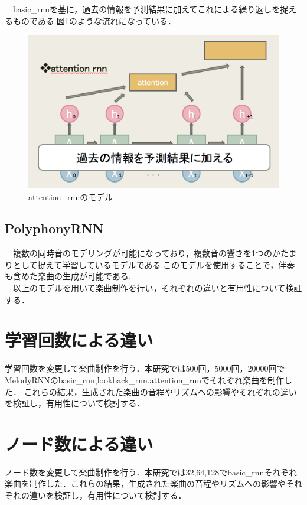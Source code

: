 　basic\_rnnを基に，過去の情報を予測結果に加えてこれによる繰り返しを捉えるものである.図\ref{fig:attentio_rnnのモデル}のような流れになっている．
\begin{figure}[!ht]
    \begin{screen}
    \begin{center}
        \includegraphics[scale=0.8,clip]{./img/attention1.png}
        \caption{attention\_rnnのモデル}
        \label{fig:attentio_rnnのモデル}
    \end{center}
    \end{screen}
\end{figure}
\subsection{PolyphonyRNN}
　複数の同時音のモデリングが可能になっており，複数音の響きを1つのかたまりとして捉えて学習しているモデルである.このモデルを使用することで，伴奏も含めた楽曲の生成が可能である.\\
　以上のモデルを用いて楽曲制作を行い，それぞれの違いと有用性について検証する．
\newpage
\section{学習回数による違い}
学習回数を変更して楽曲制作を行う．本研究では500回，5000回，20000回でMelodyRNNのbasic\_rnn,lookback\_rnn,attention\_rnnでそれぞれ楽曲を制作した．
これらの結果，生成された楽曲の音程やリズムへの影響やそれぞれの違いを検証し，有用性について検討する．
\section{ノード数による違い}
ノード数を変更して楽曲制作を行う．本研究では32,64,128でbasic\_rnnそれぞれ楽曲を制作した．これらの結果，生成された楽曲の音程やリズムへの影響やそれぞれの違いを検証し，有用性について検討する．